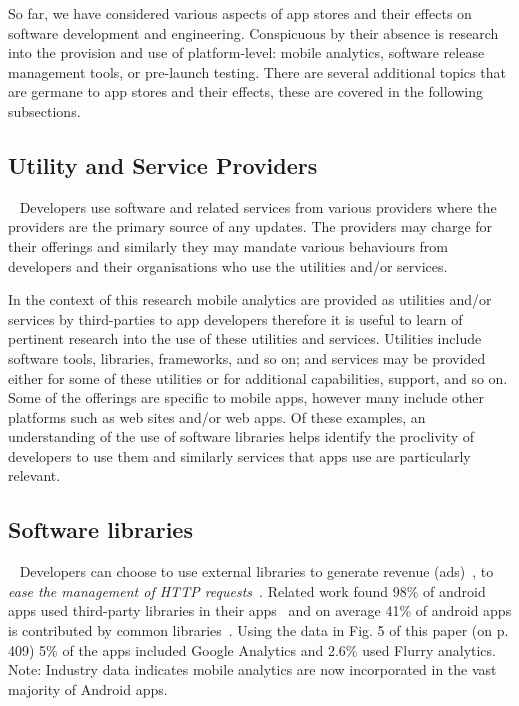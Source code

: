 So far, we have considered various aspects of app stores and their effects on software development and engineering. Conspicuous by their absence is research into the provision and use of platform-level: mobile analytics, software release management tools, or pre-launch testing. There are several additional topics that are germane to app stores and their effects, these are covered in the following subsections.


\subsection{Utility and Service Providers}~\label{rw-utility-and-service-providers-topic}
Developers use software and related services from various providers where the providers are the primary source of any updates. The providers may charge for their offerings and similarly they may mandate various behaviours from developers and their organisations who use the utilities and/or services.

In the context of this research mobile analytics are provided as utilities and/or services by third-parties to app developers therefore it is useful to learn of pertinent research into the use of these utilities and services. Utilities include software tools, libraries, frameworks, and so on; and services may be provided either for some of these utilities or for additional capabilities, support, and so on. Some of the offerings are specific to mobile apps, however many include other platforms such as web sites and/or web apps. Of these examples, an understanding of the use of software libraries helps identify the proclivity of developers to use them and similarly services that apps use are particularly relevant.


\subsection{Software libraries}~\label{rw-software-libraries-topic}
Developers can choose to use external libraries to generate revenue (ads)~, to \emph{ease the management of HTTP requests}~. Related work found 98\% of android apps used third-party libraries in their apps~ and on average 41\% of android apps is contributed by common libraries~. Using the data in Fig. 5 of this paper (on p. 409) 5\% of the apps included Google Analytics and 2.6\% used Flurry analytics. Note: Industry data indicates mobile analytics are now incorporated in the vast majority of Android apps.  

